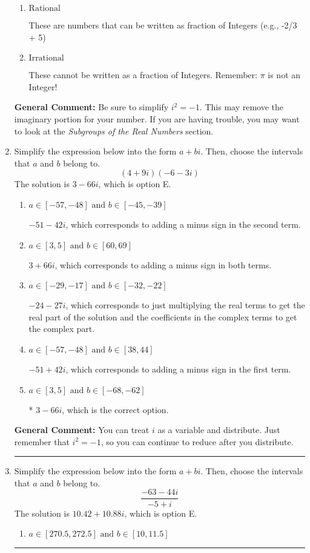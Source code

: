 \documentclass{extbook}[14pt]
\newcommand{\litem}[1]{\item #1

\rule{\textwidth}{0.4pt}}
\begin{document}
\begin{enumerate}
{\begin{enumerate}[label=\Alph*.]
This is not a number. The only non-Complex number we know is dividing by 0 as this is not a number!
\item \( \text{Rational} \)

These are numbers that can be written as fraction of Integers (e.g., -2/3 + 5)
\item \( \text{Irrational} \)

These cannot be written as a fraction of Integers. Remember: $\pi$ is not an Integer!
\end{enumerate}

\textbf{General Comment:} Be sure to simplify $i^2 = -1$. This may remove the imaginary portion for your number. If you are having trouble, you may want to look at the \textit{Subgroups of the Real Numbers} section.
}
\litem{
Simplify the expression below into the form $a+bi$. Then, choose the intervals that $a$ and $b$ belong to.
\[ (4 + 9 i)(-6 - 3 i) \]The solution is \( 3 - 66 i \), which is option E.\begin{enumerate}[label=\Alph*.]
\item \( a \in [-57, -48] \text{ and } b \in [-45, -39] \)

 $-51 - 42 i$, which corresponds to adding a minus sign in the second term.
\item \( a \in [3, 5] \text{ and } b \in [60, 69] \)

 $3 + 66 i$, which corresponds to adding a minus sign in both terms.
\item \( a \in [-29, -17] \text{ and } b \in [-32, -22] \)

 $-24 - 27 i$, which corresponds to just multiplying the real terms to get the real part of the solution and the coefficients in the complex terms to get the complex part.
\item \( a \in [-57, -48] \text{ and } b \in [38, 44] \)

 $-51 + 42 i$, which corresponds to adding a minus sign in the first term.
\item \( a \in [3, 5] \text{ and } b \in [-68, -62] \)

* $3 - 66 i$, which is the correct option.
\end{enumerate}

\textbf{General Comment:} You can treat $i$ as a variable and distribute. Just remember that $i^2=-1$, so you can continue to reduce after you distribute.
}
\litem{
Simplify the expression below into the form $a+bi$. Then, choose the intervals that $a$ and $b$ belong to.
\[ \frac{-63 - 44 i}{-5 + i} \]The solution is \( 10.42  + 10.88 i \), which is option E.\begin{enumerate}[label=\Alph*.]
\item \( a \in [270.5, 272.5] \text{ and } b \in [10, 11.5] \)


\end{enumerate}}
\end{enumerate}
\end{document}
